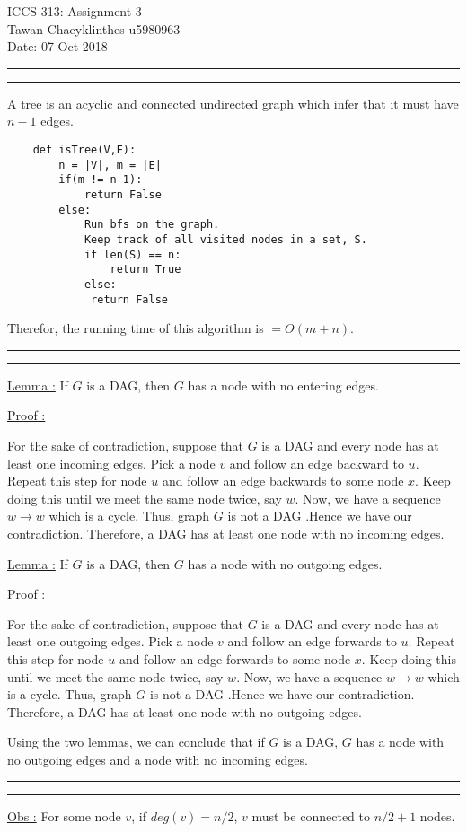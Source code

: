 \documentclass[a4paper, 12pt]{article}
\newcommand{\question}[1] {\vspace{.25in} \hrule\vspace{0.5em}
	\noindent{\bf #1} \vspace{0.5em}
	\hrule \vspace{.10in}}
\begin{document}
	\medskip
	
	\thispagestyle{plain}
	\begin{center}
		{\Large ICCS 313: Assignment 3}\\
		Tawan Chaeyklinthes u5980963\\
		Date: 07 Oct 2018
	\end{center}

\question{Problem 1}
A tree is an acyclic and connected undirected graph which infer that it must have $n-1$ edges.
\begin{lstlisting}
	def isTree(V,E):
		n = |V|, m = |E|
		if(m != n-1):
			return False
		else:
			Run bfs on the graph.
			Keep track of all visited nodes in a set, S.
			if len(S) == n:
				return True
			else:
			 return False
\end{lstlisting}
Therefor, the running time of this algorithm is  $= O(m+n)$.
\question{Problem 2}
\underline{Lemma :} If $G$ is a DAG, then $G$ has a node with no entering edges.
 
\underline{Proof :} 

For the sake of contradiction, suppose that $G$ is a DAG and every node has at least one incoming edges. Pick a node $v$ and follow an edge backward to $u$. Repeat this step for node $u$ and follow an edge backwards to some node $x$. Keep doing this until we meet the same node twice, say $w$. Now, we have a sequence  $w \rightarrow w$  which is a cycle. Thus, graph $G$ is not a DAG .Hence we have our contradiction. Therefore, a DAG has at least one node with no incoming edges.

\underline{Lemma :} If $G$ is a DAG, then $G$ has a node with no outgoing edges.

\underline{Proof :}

For the sake of contradiction, suppose that $G$ is a DAG and every node has at least one outgoing edges. Pick a node $v$ and follow an edge forwards to $u$. Repeat this step for node $u$ and follow an edge forwards to some node $x$. Keep doing this until we meet the same node twice, say $w$. Now, we have a sequence  $w \rightarrow w$  which is a cycle. Thus, graph $G$ is not a DAG .Hence we have our contradiction. Therefore, a DAG has at least one node with no outgoing edges.  

Using the two lemmas, we can conclude that if $G$ is a DAG, $G$ has a node with no outgoing edges and a node with no incoming edges.

\question{Problem 3}
\underline{Obs :} For some node $v$, if $deg(v) = n/2 $, $v$  must be connected to $n/2+1$ nodes.
\end{document}
